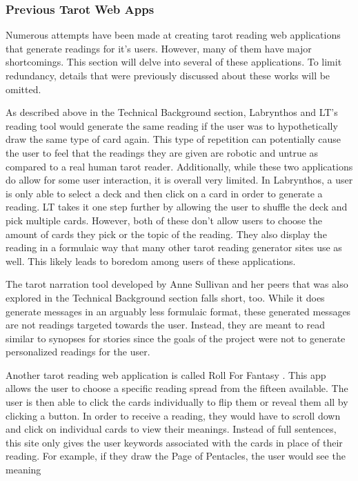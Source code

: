 \documentclass[10pt,twocolumn]{article}
\begin{document}
\subsubsection{Previous Tarot Web Apps}
    Numerous attempts have been made at creating tarot reading web applications that generate readings for it's 
    users. However, many of them have major shortcomings. This section will delve into several of these applications. To limit redundancy, details that were previously discussed about these works will be omitted.
    
    As described above in the Technical Background section, Labrynthos\cite{labrynthos} and LT's reading tool\cite{lt} would generate the same reading if the user was to hypothetically draw the same type of card again. This type of repetition can potentially cause the user to feel that the readings they are given are robotic and untrue as compared to a real human tarot reader. Additionally, while these two applications do allow for some user interaction, it is overall very limited. In Labrynthos, a user is only able to select a deck and then click on a card in order to generate a reading. LT takes it one step further by allowing the user to shuffle the deck and pick multiple cards. However, both of these don't allow users to choose the amount of cards they pick or the topic of the reading. They also display the reading in a formulaic way that many other tarot reading generator sites use as well. This likely leads to boredom among users of these applications.
    
    The tarot narration tool developed by Anne Sullivan and her peers\cite{Sullivan2018TarotbasedNG} that was also explored in the Technical Background section falls short, too. While it does generate messages in an arguably less formulaic format, these generated messages are not readings targeted towards the user. Instead, they are meant to read similar to synopses for stories since the goals of the project were not to generate personalized readings for the user. 
    
    Another tarot reading web application is called Roll For Fantasy \cite{roll}. This app allows the user to choose a specific reading spread from the fifteen available. The user is then able to click the cards individually to flip them or reveal them all by clicking a button. In order to receive a reading, they would have to scroll down and click on individual cards to view their meanings. Instead of full sentences, this site only gives the user keywords associated with the cards in place of their reading. For example, if they draw the Page of Pentacles, the user would see the meaning 
    
\end{document}

